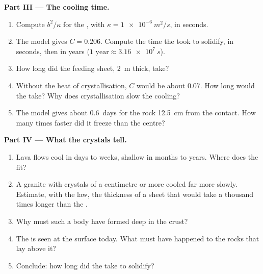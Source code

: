 \begin{problem}
\medskip
\noindent\textbf{Part III --- The cooling time.}
\begin{enumerate}[resume]
  \item Compute $b^2/\kappa$ for the , with $\kappa = \qty{1e-6}{m^2/s}$,
        in seconds.
  \item The model gives $C = 0.206$. Compute the time the  took to solidify, in
        seconds, then in years ($\num{1}\text{ year} \approx \qty{3.16e7}{s}$).
  \item How long did the feeding sheet, \qty{2}{m} thick, take?
  \item Without the heat of crystallisation, $C$ would be about $0.07$.
        How long would the  take? Why does crystallisation slow the
        cooling?
  \item The model gives about \num{0.6}~days for the rock \qty{12.5}{cm}
        from the contact. How many times faster did it freeze than the
        centre?
\end{enumerate}

\medskip
\noindent\textbf{Part IV --- What the crystals tell.}
\begin{enumerate}[resume]
  \item Lava flows cool in days to weeks, shallow  in months to
        years. Where does the  fit?
  \item A granite with crystals of a centimetre or more cooled far more
        slowly. Estimate, with the law, the thickness of a sheet that would
        take a thousand times longer than the .
  \item Why must such a body have formed deep in the crust?
  \item The  is seen at the surface today. What must have happened to
        the rocks that lay above it?
  \item Conclude: how long did the  take to solidify?
\end{enumerate}
\end{problem}
